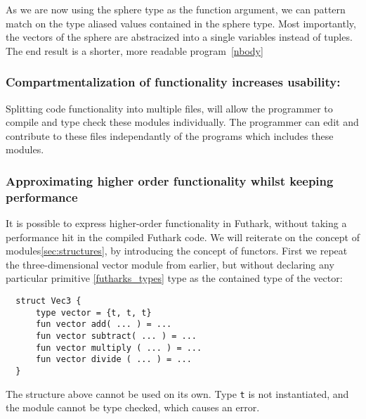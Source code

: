 \noindent As we are now using the sphere type as the function argument, we can pattern
match on the type aliased values contained in the sphere type.
Most importantly, the vectors of the sphere are abstracized into a single variables
instead of tuples.
\\
The end result is a shorter, more readable program~\ref{nbody}

\subsubsection{Compartmentalization of functionality increases usability:}
Splitting code functionality into multiple files, will allow the programmer to
compile and type check these modules individually. The programmer can edit and
contribute to these files independantly of the programs which includes these
modules.

\subsubsection{Approximating higher order functionality whilst keeping performance}
\label{subsec:higherorderfunctionality}
It is possible to express higher-order functionality in Futhark, without taking
a performance hit in the compiled Futhark code.
We will reiterate on the concept of modules\ref{sec:structures}, by introducing
the concept of functors.
First we repeat the three-dimensional vector module
from earlier, but without declaring any particular
primitive \ref{futharks_types} type as the contained type of the vector:
\begin{verbatim}
  struct Vec3 {
      type vector = {t, t, t}
      fun vector add( ... ) = ...
      fun vector subtract( ... ) = ...
      fun vector multiply ( ... ) = ...
      fun vector divide ( ... ) = ...
  }
\end{verbatim}
\noindent
The structure above cannot be used on its own. Type \texttt{t} is not
instantiated, and the module cannot be type checked, which causes an error.

